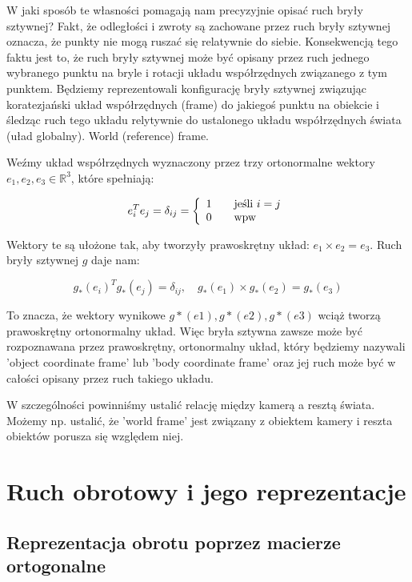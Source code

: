 \documentclass[a4paper,12pt]{article}
\newcommand{\RR}{\mathbb{R}^3}
\begin{document}
W jaki sposób te własności pomagają nam precyzyjnie opisać ruch bryły sztywnej? Fakt, że odległości i zwroty są zachowane przez ruch bryły sztywnej oznacza, że punkty nie mogą ruszać się relatywnie do siebie. Konsekwencją tego faktu jest to, że ruch bryły sztywnej może być opisany przez ruch jednego wybranego punktu na bryle i rotacji układu współrzędnych związanego z tym punktem. Będziemy reprezentowali konfigurację bryły sztywnej związując koratezjański układ współrzędnych (frame) do jakiegoś punktu na obiekcie i śledząc ruch tego układu relytywnie do ustalonego układu współrzędnych świata (uład globalny). World (reference) frame.

Weźmy układ współrzędnych wyznaczony przez trzy ortonormalne wektory $e_1,e_2,e_3 \in \RR$, które spełniają:

\begin{equation}
e^T_ie_j = \delta_{ij} = \left\{
  \begin{array}{l l}
    1 & \quad \text{jeśli $i=j$}\\
    0 & \quad \text{wpw}\\
  \end{array} \right.
\end{equation}

Wektory te są ułożone tak, aby tworzyły prawoskrętny układ: $e_1 \times e_2 = e_3$. Ruch bryły sztywnej $g$ daje nam:

\begin{equation}
g_*(e_i)^Tg_*(e_j) = \delta_{ij}, \quad g_*(e_1) \times g_*(e_2) = g_*(e_3)
\end{equation}

To znacza, że wektory wynikowe $g*(e1),g*(e2),g*(e3)$ wciąż tworzą prawoskrętny ortonormalny układ. Więc bryła sztywna zawsze może być rozpoznawana przez prawoskrętny, ortonormalny układ, który będziemy nazywali 'object coordinate frame' lub 'body coordinate frame' oraz jej ruch może być w całości opisany przez ruch takiego układu.

W szczególności powinniśmy ustalić relację między kamerą a resztą świata. Możemy np. ustalić, że 'world frame' jest związany z obiektem kamery i reszta obiektów porusza się względem niej.


\section{Ruch obrotowy i jego reprezentacje}

\subsection{Reprezentacja obrotu poprzez macierze ortogonalne}
\end{document}
